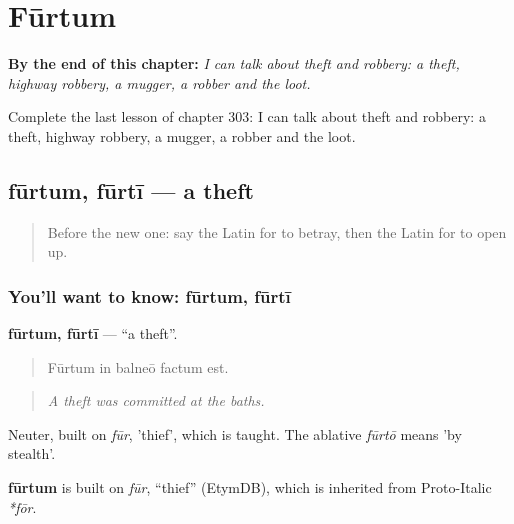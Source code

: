 
\chapter{Fūrtum}
\label{ch:la-furtum}

\begin{chapteropening}
\textbf{By the end of this chapter:} \emph{I can talk about theft and robbery: a theft, highway robbery, a mugger, a robber and the loot.}

Complete the last lesson of chapter 303: I can talk about theft and robbery: a theft, highway robbery, a mugger, a robber and the loot.
\end{chapteropening}

\section[fūrtum, fūrtī]{fūrtum, fūrtī — a theft}

\label{lesson:LA-C303-furtum}



\begin{quote}
Before the new one: say the Latin for to betray, then the Latin for to open up.
\end{quote}

\subsection*{You'll want to know: fūrtum, fūrtī}
\textbf{fūrtum, fūrtī} — \textquotedblleft{}a theft\textquotedblright{}.

\begin{quote}
Fūrtum in balneō factum est.
\end{quote}

\begin{quote}
\emph{A theft was committed at the baths.}
\end{quote}

Neuter, built on \emph{fūr}, 'thief', which is taught. The ablative \emph{fūrtō} means 'by stealth'.

\begin{cousinweb}
\textbf{fūrtum} is built on \emph{fūr}, \textquotedblleft{}thief\textquotedblright{} (EtymDB), which is inherited from Proto-Italic \emph{*fōr}.
\end{cousinweb}

